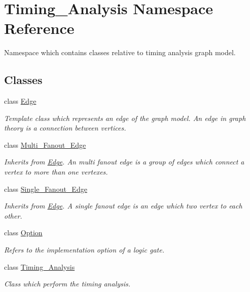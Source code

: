 \hypertarget{namespaceTiming__Analysis}{\section{Timing\-\_\-\-Analysis Namespace Reference}
\label{namespaceTiming__Analysis}
}


Namespace which contains classes relative to timing analysis graph model.  


\subsection*{Classes}
\begin{DoxyCompactItemize}
\item 
class \hyperlink{classTiming__Analysis_1_1Edge}{Edge}
\begin{DoxyCompactList}\small\item\em Template class which represents an edge of the graph model. An edge in graph theory is a connection between vertices. \end{DoxyCompactList}\item 
class \hyperlink{classTiming__Analysis_1_1Multi__Fanout__Edge}{Multi\-\_\-\-Fanout\-\_\-\-Edge}
\begin{DoxyCompactList}\small\item\em Inherits from \hyperlink{classTiming__Analysis_1_1Edge}{Edge}. An multi fanout edge is a group of edges which connect a vertex to more than one vertexes. \end{DoxyCompactList}\item 
class \hyperlink{classTiming__Analysis_1_1Single__Fanout__Edge}{Single\-\_\-\-Fanout\-\_\-\-Edge}
\begin{DoxyCompactList}\small\item\em Inherits from \hyperlink{classTiming__Analysis_1_1Edge}{Edge}. A single fanout edge is an edge which two vertex to each other. \end{DoxyCompactList}\item 
class \hyperlink{classTiming__Analysis_1_1Option}{Option}
\begin{DoxyCompactList}\small\item\em Refers to the implementation option of a logic gate. \end{DoxyCompactList}\item 
class \hyperlink{classTiming__Analysis_1_1Timing__Analysis}{Timing\-\_\-\-Analysis}
\begin{DoxyCompactList}\small\item\em Class which perform the timing analysis. \end{DoxyCompactList}\item 

\end{DoxyCompactItemize}
